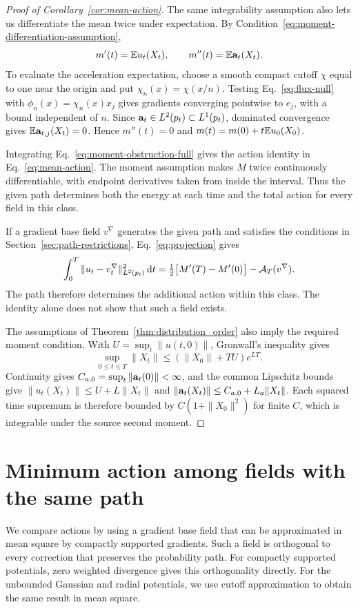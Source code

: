 \begin{proof}[Proof of Corollary~\ref{cor:mean-action}]
The same integrability assumption also lets us differentiate the mean twice under expectation. By Condition~\eqref{eq:moment-differentiation-assumption},
\[
 m'(t)=\mathbb E u_t(X_t),\qquad m''(t)=\mathbb E\mathbf a_t(X_t).
\]
To evaluate the acceleration expectation, choose a smooth compact cutoff $\chi$ equal to one near the origin and put $\chi_n(x)=\chi(x/n)$. Testing Eq.~\eqref{eq:flux-null} with $\phi_n(x)=\chi_n(x)x_j$ gives gradients converging pointwise to $e_j$, with a bound independent of $n$. Since $\mathbf a_t\in L^2(p_t)\subset L^1(p_t)$, dominated convergence gives $\mathbb E\mathbf a_{t,j}(X_t)=0$. Hence $m''(t)=0$ and $m(t)=m(0)+t\mathbb E u_0(X_0)$.

Integrating Eq.~\eqref{eq:moment-obstruction-full} gives the action identity in Eq.~\eqref{eq:mean-action}. The moment assumption makes $M$ twice continuously differentiable, with endpoint derivatives taken from inside the interval. Thus the given path determines both the energy at each time and the total action for every field in this class.

If a gradient base field $v^\nabla$ generates the given path and satisfies the conditions in Section~\ref{sec:path-restrictions}, Eq.~\eqref{eq:projection} gives
\[
 \int_0^T\|u_t-v_t^\nabla\|_{L^2(p_t)}^2\,\mathrm d t
 =\tfrac12\bigl[M'(T)-M'(0)\bigr]-\mathcal A_T(v^\nabla).
\]
The path therefore determines the additional action within this class. The identity alone does not show that such a field exists.

The assumptions of Theorem~\ref{thm:distribution_order} also imply the required moment condition. With $U=\sup_t\|u(t,0)\|$, Gronwall's inequality gives
\[
 \sup_{0\le t\le T}\|X_t\|\le (\|X_0\|+TU)e^{LT}.
\]
Continuity gives $C_{a,0}=\sup_t\|\mathbf a_t(0)\|<\infty$, and the common Lipschitz bounds give $\|u_t(X_t)\|\le U+L\|X_t\|$ and $\|\mathbf a_t(X_t)\|\le C_{a,0}+L_a\|X_t\|$. Each squared time supremum is therefore bounded by $C(1+\|X_0\|^2)$ for finite $C$, which is integrable under the source second moment.
\end{proof}

\section{Minimum action among fields with the same path}
\label{app:projection}

We compare actions by using a gradient base field that can be approximated in mean square by compactly supported gradients. Such a field is orthogonal to every correction that preserves the probability path. For compactly supported potentials, zero weighted divergence gives this orthogonality directly. For the unbounded Gaussian and radial potentials, we use cutoff approximation to obtain the same result in mean square.

